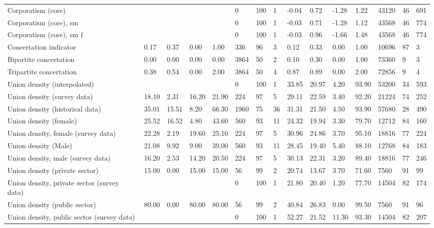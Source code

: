 \begin{longtable}{lllllllllllllll}
Corporatism (core) &  &  &  &  & 0 & 100 & 1 & -0.04 & 0.72 & -1.28 & 1.22 & 43120 & 46 & 691\\
\addlinespace
Corporatism (core), sm &  &  &  &  & 0 & 100 & 1 & -0.03 & 0.71 & -1.28 & 1.12 & 43568 & 46 & 774\\
Corporatism (core), sm f &  &  &  &  & 0 & 100 & 1 & -0.03 & 0.96 & -1.66 & 1.48 & 43568 & 46 & 774\\
Concertation indicator & 0.17 & 0.37 & 0.00 & 1.00 & 336 & 96 & 3 & 0.12 & 0.33 & 0.00 & 1.00 & 10696 & 87 & 3\\
Bipartite concertation & 0.00 & 0.00 & 0.00 & 0.00 & 3864 & 50 & 2 & 0.10 & 0.30 & 0.00 & 1.00 & 73360 & 9 & 3\\
Tripartite concertation & 0.38 & 0.54 & 0.00 & 2.00 & 3864 & 50 & 4 & 0.87 & 0.89 & 0.00 & 2.00 & 72856 & 9 & 4\\
\addlinespace
Union density (interpolated) &  &  &  &  & 0 & 100 & 1 & 33.85 & 20.97 & 4.20 & 93.90 & 53200 & 34 & 593\\
Union density (survey data) & 18.10 & 2.31 & 16.20 & 21.90 & 224 & 97 & 5 & 29.11 & 22.59 & 3.40 & 92.20 & 21224 & 74 & 252\\
Union density (historical data) & 35.01 & 15.51 & 8.20 & 66.30 & 1960 & 75 & 36 & 31.31 & 21.50 & 4.50 & 93.90 & 57680 & 28 & 490\\
Union density (female) & 25.52 & 16.52 & 4.80 & 43.60 & 560 & 93 & 11 & 24.32 & 19.94 & 3.30 & 79.70 & 12712 & 84 & 160\\
Union density, female (survey data) & 22.28 & 2.19 & 19.60 & 25.10 & 224 & 97 & 5 & 30.96 & 24.86 & 3.70 & 95.10 & 18816 & 77 & 224\\
\addlinespace
Union density (Male) & 21.08 & 9.92 & 9.00 & 39.00 & 560 & 93 & 11 & 28.45 & 19.40 & 5.40 & 88.10 & 12768 & 84 & 183\\
Union density, male (survey data) & 16.20 & 2.53 & 14.20 & 20.50 & 224 & 97 & 5 & 30.13 & 22.31 & 3.20 & 89.40 & 18816 & 77 & 246\\
Union density (private sector) & 15.00 & 0.00 & 15.00 & 15.00 & 56 & 99 & 2 & 20.74 & 13.67 & 3.70 & 71.60 & 7560 & 91 & 99\\
Union density, private sector (survey data) &  &  &  &  & 0 & 100 & 1 & 21.80 & 20.40 & 1.20 & 77.70 & 14504 & 82 & 174\\
Union density (public sector) & 80.00 & 0.00 & 80.00 & 80.00 & 56 & 99 & 2 & 40.84 & 26.83 & 0.00 & 99.50 & 7560 & 91 & 96\\
\addlinespace
Union density, public sector (survey data) &  &  &  &  & 0 & 100 & 1 & 52.27 & 21.52 & 11.30 & 93.30 & 14504 & 82 & 207\\

\end{longtable}
